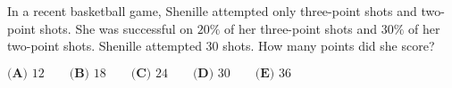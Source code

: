In a recent basketball game, Shenille attempted only three-point shots and two-point shots. She was successful on $20\%$ of her three-point shots and $30\%$ of her two-point shots. Shenille attempted $30$ shots. How many points did she score?

$\textbf{(A) }12\qquad\textbf{(B) }18\qquad\textbf{(C) }24\qquad\textbf{(D) }30\qquad\textbf{(E) }36$